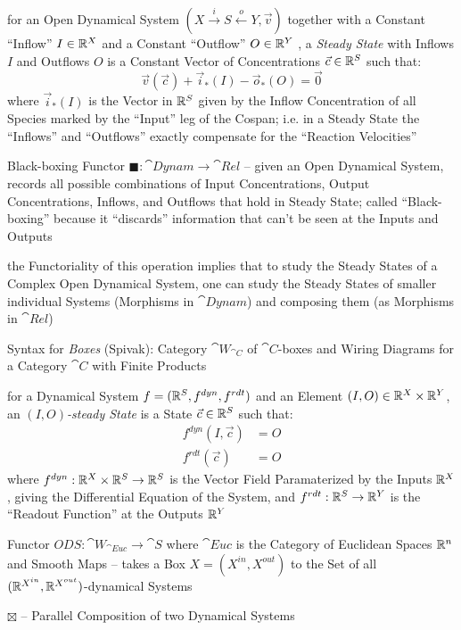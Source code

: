 for an Open Dynamical System $(X \xrightarrow{i} S \xleftarrow{o} Y, \vec{v})$
together with a Constant ``Inflow'' $I \in \mathbb{R}^X$ and a Constant ``Outflow''
$O \in \mathbb{R}^Y$ , a \emph{Steady State} with Inflows $I$ and Outflows $O$ is a
Constant Vector of Concentrations $\vec{c} \in \mathbb{R}^S$ such that:
\[
  \vec{v}(\vec{c}) + \vec{i}_*(I) - \vec{o}_*(O) = \vec{0}
\]
where $\vec{i}_*(I)$ is the Vector in $\mathbb{R}^S$ given by the Inflow
Concentration of all Species marked by the ``Input'' leg of the Cospan; i.e. in
a Steady State the ``Inflows'' and ``Outflows'' exactly compensate for the
``Reaction Velocities''

Black-boxing Functor $\blacksquare : \cat{Dynam} \rightarrow \cat{Rel}$ --
given an Open Dynamical System, records all possible combinations of Input
Concentrations, Output Concentrations, Inflows, and Outflows that hold in
Steady State; called ``Black-boxing'' because it ``discards'' information that
can't be seen at the Inputs and Outputs

the Functoriality of this operation implies that to study the Steady States of
a Complex Open Dynamical System, one can study the Steady States of smaller
individual Systems (Morphisms in $\cat{Dynam}$) and composing them (as
Morphisms in $\cat{Rel}$)

Syntax for \emph{Boxes} (Spivak):
Category $\cat{W}_{\cat{C}}$ of $\cat{C}$-boxes and Wiring Diagrams for a
Category $\cat{C}$ with Finite Products

for a Dynamical System $f = (\mathbb{R}^S, f^{dyn}, f^{rdt})$ and an Element $(I,O)
\in \mathbb{R}^X \times \mathbb{R}^Y$, an \emph{$(I,O)$-steady State} is a State
$\vec{c} \in \mathbb{R}^S$ such that:
\begin{align*}
  f^{dyn}(I,\vec{c}) & = O \\
  f^{rdt}(\vec{c})   & = O
\end{align*}
where $f^{dyn} : \mathbb{R}^X \times \mathbb{R}^S \rightarrow \mathbb{R}^S$ is the Vector
Field Paramaterized by the Inputs $\mathbb{R}^X$, giving the Differential Equation
of the System, and $f^{rdt} : \mathbb{R}^S \rightarrow \mathbb{R}^Y$ is the ``Readout
Function'' at the Outputs $\mathbb{R}^Y$

Functor $ODS : \cat{W}_{\cat{Euc}} \rightarrow \cat{S}$ where $\cat{Euc}$ is
the Category of Euclidean Spaces $\mathbb{R}^n$ and Smooth Maps -- takes a Box $X =
(X^{in},X^{out})$ to the Set of all
$(\mathbb{R}^{X^{in}}, \mathbb{R}^{X^{out}})$-dynamical Systems

$\boxtimes$ -- Parallel Composition of two Dynamical Systems


